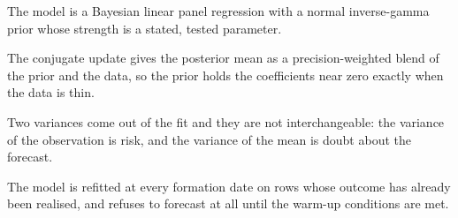 \begin{keytakeaways}
\item The model is a Bayesian linear panel regression with a normal
inverse-gamma prior whose strength is a stated, tested parameter.
\item The conjugate update gives the posterior mean as a precision-weighted
blend of the prior and the data, so the prior holds the coefficients near
zero exactly when the data is thin.
\item Two variances come out of the fit and they are not interchangeable:
the variance of the observation is risk, and the variance of the mean is
doubt about the forecast.
\item The model is refitted at every formation date on rows whose outcome
has already been realised, and refuses to forecast at all until the
warm-up conditions are met.
\end{keytakeaways}
